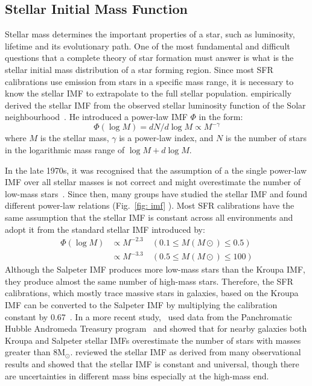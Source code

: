 \subsection{Stellar Initial Mass Function}
\label{sec: imf}
Stellar mass determines the important properties of a star, such as luminosity, lifetime and its evolutionary path. 
One of the most fundamental and difficult questions that a complete theory of star formation must answer is what is the stellar initial mass distribution of a star forming region.
Since most SFR calibrations use emission from stars in a specific mass range, it is necessary to know the stellar IMF to extrapolate to the full stellar population.
\cite{Salpeter55} empirically derived the stellar IMF from the observed stellar luminosity function of the Solar neighbourhood~\citep{Shu87}. 
He introduced a power-law IMF $\Phi$  in the form:
\begin{equation}
\label{equ: salp}
\Phi (\log M) = dN / d \log M \propto M^{-\gamma }
\end{equation} 
where $M$ is the stellar mass, $\gamma$ is a power-law index, and $N$ is the number of stars in the logarithmic mass range of $\log M + d\log M$. %

In the late 1970s, it was recognised that the assumption of a the single power-law IMF over all stellar masses is not correct and might overestimate the number of low-mass stars~\citep{Kroupa93, Bastin10}. 
Since then, many groups have studied the stellar IMF and found different power-law relations (Fig.~\ref{fig: imf} ). 
Most SFR calibrations have the same assumption that the stellar IMF is constant across all environments and adopt it from the standard stellar IMF introduced by\cite{Kroupa01}:
\begin{equation}
\begin{split}
    \Phi (\log M) & \propto M^{-2.3}    \quad    (0.1 \le M(M{\odot}) \le 0.5)\\                  
           & \propto M^{-3.3}    \quad    (0.5 \le M(M{\odot}) \le 100)
\end{split}
\end{equation}
Although the Salpeter IMF produces more low-mass stars than the Kroupa IMF, they produce almost the same number of high-mass stars. 
Therefore, the SFR calibrations, which mostly trace massive stars in galaxies, based on the Kroupa IMF can be converted to the Salpeter IMF by multiplying the calibration constant by 0.67~\citep{Madau14}.
In a more recent study,~\cite{Weisz15} used data from the Panchromatic Hubble Andromeda Treasury program~\citep[PHAT][]{Dalcanton12} and showed that for nearby galaxies both Kroupa and Salpeter stellar IMFs overestimate the number of stars with masses greater than 8M$_\odot$.
\cite{Bastin10} reviewed the stellar IMF as derived from many observational results and showed that the stellar IMF is constant and universal, though there are uncertainties in different mass bins especially at the high-mass end. 

